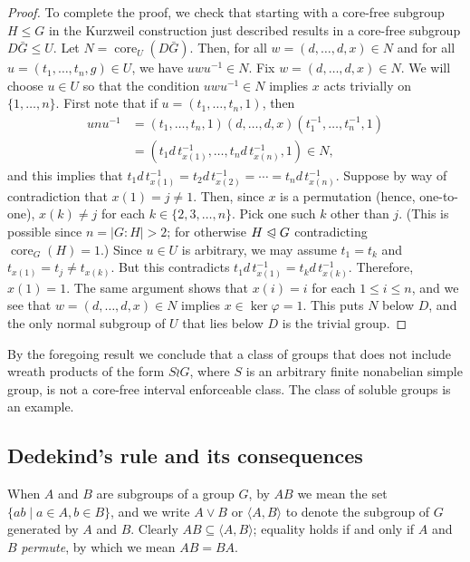 \documentclass[11pt]{amsart}
\theoremstyle{plain}
\theoremstyle{definition}
\theoremstyle{remark}
\numberwithin{theorem}{section}
\numberwithin{claim}{section}
\numberwithin{equation}{section}
\numberwithin{conjecture}{section}
\newcommand{\<}{\ensuremath{\langle}}
\renewcommand{\>}{\ensuremath{\rangle}}
\renewcommand{\leq}{\ensuremath{\leqslant}}
\newcommand{\subnormal}{\ensuremath{\trianglelefteqslant}}
\newcommand{\join}{\ensuremath{\vee}}
\newcommand{\core}{\ensuremath{\operatorname{core}}}
\newcommand{\0}{\ensuremath{\mathbf{0}}}
\newcommand{\1}{\ensuremath{\mathbf{1}}}
\newcommand{\2}{\ensuremath{\mathbf{2}}}
\newcommand{\3}{\ensuremath{\mathbf{3}}}
\newcommand{\4}{\ensuremath{\mathbf{4}}}
\newcommand{\5}{\ensuremath{\mathbf{5}}}
\renewcommand{\phi}{\ensuremath{\varphi}}
\begin{document}
\begin{proof}
  To complete the proof, we check that starting with a core-free subgroup
  $H \leq G$ in the Kurzweil construction just described results in a
  core-free subgroup $D \bar{G} \leq U$.   Let $N = \core_U(D\bar{G})$.  Then, for all $w=(d,\dots, d, x) \in N$ and for all 
  $u = (t_1,\dots, t_n, g)\in U$, we have $u w u^{-1}\in N$. 
  Fix $w=(d,\dots, d, x) \in N$.  We will choose $u\in U$ so that
  the condition $u w u^{-1}\in N$ implies $x$ acts trivially on $\{1, \dots, n\}$.
  First note that if $u = (t_1,\dots, t_n, 1)$, then
  \begin{align*}
  u n u^{-1} &= (t_1,\dots, t_n, 1) (d, \dots, d, x) (t_1^{-1},\dots, t_n^{-1}, 1)\\
  &=(t_1 d \,t_{x(1)}^{-1},\dots, t_nd \,t_{x(n)}^{-1}, 1) \in N,
  \end{align*}
  and this implies that $t_1 d\, t_{x(1)}^{-1} = t_2 d\, t_{x(2)}^{-1} =\cdots = t_nd \,t_{x(n)}^{-1}$. 
  Suppose by way of contradiction that $x(1) = j\neq 1$.  Then, since $x$ is a
  permutation (hence, one-to-one), $x(k) \neq j$ for
  each $k\in \{2, 3, \dots, n\}$.  Pick one such $k$ other than $j$.
  (This is possible since $n = |G:H|>2$; for otherwise $H\subnormal G$
  contradicting $\core_G(H)=1$.) 
  Since $u \in U$ is arbitrary, we may assume
  $t_1 = t_k$ and $t_{x(1)}=t_j\neq t_{x(k)}$.  
  But this contradicts $t_1 d\, t_{x(1)}^{-1} = t_k d\, t_{x(k)}^{-1}$.
  Therefore, $x(1) = 1$.  The same argument shows that 
  $x(i) = i$ for each $1\leq i\leq n$, 
  and we see that
  $w=(d,\dots,d, x) \in N$ implies $x\in \ker \phi = 1$.  This puts $N$ below
  $D$, and the only normal subgroup of $U$ that lies 
  below $D$ is the trivial group.
\end{proof}
By the foregoing result we conclude that a class of groups that does
not include wreath products of the form $S\wr G$, where $S$ is an arbitrary
finite nonabelian simple group, is not a core-free interval enforceable class. 
The class of soluble groups is an example.




\subsection{Dedekind's rule and its consequences}
\label{sec:dedekinds-rule}
When $A$ and $B$ are subgroups of a group $G$, by $AB$ we mean the set
$\{ a b \mid a\in A, b\in B\}$, and we write $A \join B$ or $\<A, B\>$ to denote
the subgroup of $G$ generated by $A$ and $B$.  
Clearly $AB \subseteq \<A,B\>$; 
equality holds if and only if $A$ and $B$ \emph{permute}, by which we mean $A B = B A$.
\end{document}
